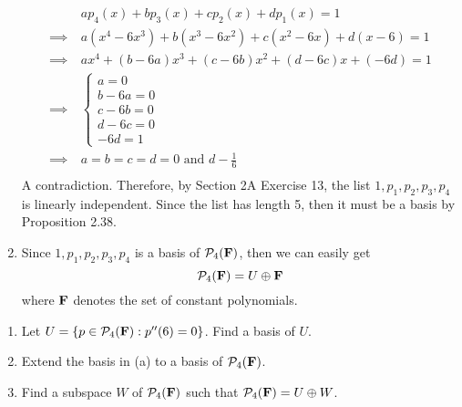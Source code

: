 \begin{solution}
\begin{enumerate}[label=(\alph*)]
        \begin{align*}
            &ap_4(x) + bp_3(x) + cp_2(x) + dp_1(x) = 1 \\
            \implies \ & a(x^4 - 6x^3) + b(x^3 - 6x^2) + c(x^2 - 6x) + d(x-6) = 1\\
            \implies \ & ax^4 + (b - 6a)x^3 + (c - 6b)x^2 + (d - 6c)x + (-6d) = 1 \\
            \implies \ & \begin{cases}
                a=0 \\ b-6a = 0 \\ c - 6b = 0 \\ d - 6c = 0 \\ -6d = 1
            \end{cases} \\
            \implies \ & a=b=c=d=0 \text{ and } d -\frac{1}{6}\\
        \end{align*}
        A contradiction. Therefore, by Section 2A Exercise 13, the list $1, p_1, p_2, p_3, p_4$ is linearly independent. Since the list has length 5, then it must be a basis by Proposition 2.38.
        \item Since $1, p_1, p_2, p_3, p_4$ is a basis of $\mathcal{P}_4(\mathbf{F})$, then we can easily get
        $$\mathcal{P}_4(\mathbf{F}) = U \oplus \mathbf{F}$$
        where $\mathbf{F}$ denotes the set of constant polynomials. \\
    \end{enumerate}
\end{solution}

\begin{exercise}
    \vspace*{-0.6cm}
    \begin{enumerate}[label=(\alph*)]
        \item Let $U = \{p \in \mathcal{P}_4(\mathbf{F}):p''(6) = 0\}$. Find a basis of $U$.
        \item Extend the basis in (a) to a basis of $\mathcal{P}_4(\mathbf{F})$.
        \item Find a subspace $W$ of $\mathcal{P}_4(\mathbf{F})$ such that $\mathcal{P}_4(\mathbf{F}) = U \oplus W$.\\
    \end{enumerate}
\end{exercise}

